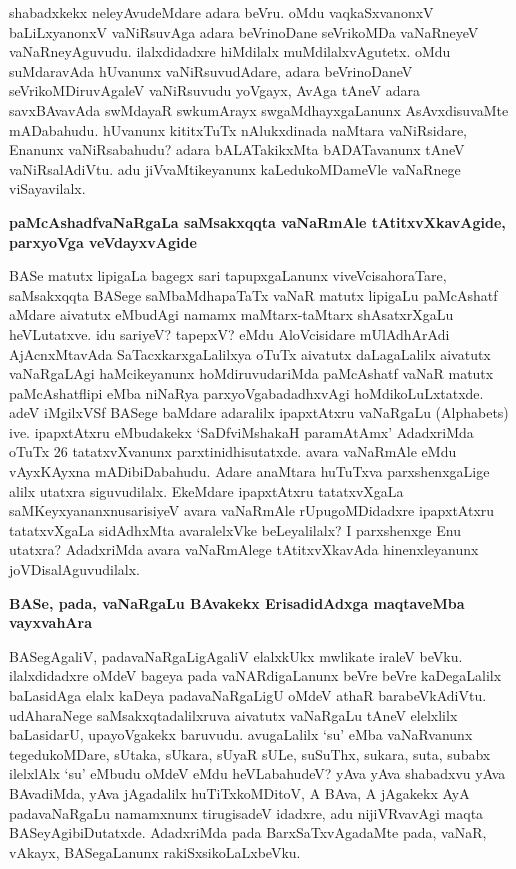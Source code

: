 shabadxkekx neleyAvudeMdare adara beVru. oMdu vaqkaSxvanonxV baLiLxyanonxV vaNiRsuvAga adara beVrinoDane seVrikoMDa vaNaRneyeV vaNaRneyAguvudu. ilalxdidadxre hiMdilalx muMdilalxvAgutetx. oMdu suMdaravAda hUvanunx vaNiRsuvudAdare, adara beVrinoDaneV seVrikoMDiruvAgaleV vaNiRsuvudu yoVgayx, AvAga tAneV adara savxBAvavAda swMdayaR swkumArayx swgaMdhayxgaLanunx AsAvxdisuvaMte mADabahudu. hUvanunx kititxTuTx nAlukxdinada naMtara vaNiRsidare, Enanunx vaNiRsabahudu? adara bALATakikxMta bADATavanunx tAneV vaNiRsalAdiVtu. adu jiVvaMtikeyanunx kaLedukoMDameVle vaNaRnege viSayavilalx.

{\bigskip
\noindent
{\large\bf paMcAshadfvaNaRgaLa saMsakxqqta vaNaRmAle tAtitxvXkavAgide, parxyoVga veVdayxvAgide}}\label{page185}
\medskip

\noindent
BASe matutx lipigaLa bagegx sari tapupxgaLanunx viveVcisahoraTare, saMsakxqqta BASege saMbaMdhapaTaTx vaNaR matutx lipigaLu paMcAshatf aMdare aivatutx eMbudAgi namamx maMtarx-taMtarx shAsatxrXgaLu heVLutatxve. idu sariyeV? tapepxV? eMdu AloVcisidare mUlAdhArAdi AjAcnxMtavAda SaTacxkarxgaLalilxya oTuTx aivatutx daLagaLalilx aivatutx vaNaRgaLAgi haMcikeyanunx hoMdiruvudariMda paMcAshatf vaNaR matutx paMcAshatflipi eMba niNaRya parxyoVgabadadhxvAgi hoMdikoLuLxtatxde. adeV iMgilxVSf BASege baMdare adaralilx ipapxtAtxru vaNaRgaLu {\rm (Alphabets)} ive. ipapxtAtxru eMbudakekx `SaDfviMshakaH paramAtAmx' AdadxriMda oTuTx 26 tatatxvXvanunx parxtinidhisutatxde. avara vaNaRmAle eMdu vAyxKAyxna mADibiDabahudu. Adare anaMtara huTuTxva parxshenxgaLige alilx utatxra siguvudilalx. EkeMdare ipapxtAtxru tatatxvXgaLa saMKeyxyananxnusarisiyeV avara vaNaRmAle rUpugoMDidadxre ipapxtAtxru tatatxvXgaLa sidAdhxMta avaralelxVke beLeyalilalx? I parxshenxge Enu utatxra? AdadxriMda avara vaNaRmAlege tAtitxvXkavAda hinenxleyanunx joVDisalAguvudilalx.

{\bigskip
\noindent
{\large\bf BASe, pada, vaNaRgaLu BAvakekx ErisadidAdxga maqtaveMba vayxvahAra}}\label{page185a}
\medskip

\noindent
BASegAgaliV, padavaNaRgaLigAgaliV elalxkUkx mwlikate iraleV beVku. ilalxdidadxre oMdeV bageya pada vaNARdigaLanunx beVre beVre kaDegaLalilx baLasidAga elalx kaDeya padavaNaRgaLigU oMdeV athaR barabeVkAdiVtu. udAharaNege saMsakxqtadalilxruva aivatutx vaNaRgaLu tAneV elelxlilx baLasidarU, upayoVgakekx baruvudu. avugaLalilx `su' eMba vaNaRvanunx tegedukoMDare, sUtaka, sUkara, sUyaR sULe, suSuThx, sukara, suta, subabx ilelxlAlx `su' eMbudu oMdeV eMdu heVLabahudeV? yAva yAva shabadxvu yAva BAvadiMda, yAva jAgadalilx huTiTxkoMDitoV, A BAva, A jAgakekx AyA padavaNaRgaLu namamxnunx tirugisadeV idadxre, adu nijiVRvavAgi maqta BASeyAgibiDutatxde. AdadxriMda pada BarxSaTxvAgadaMte pada, vaNaR, vAkayx, BASegaLanunx rakiSxsikoLaLxbeVku.


